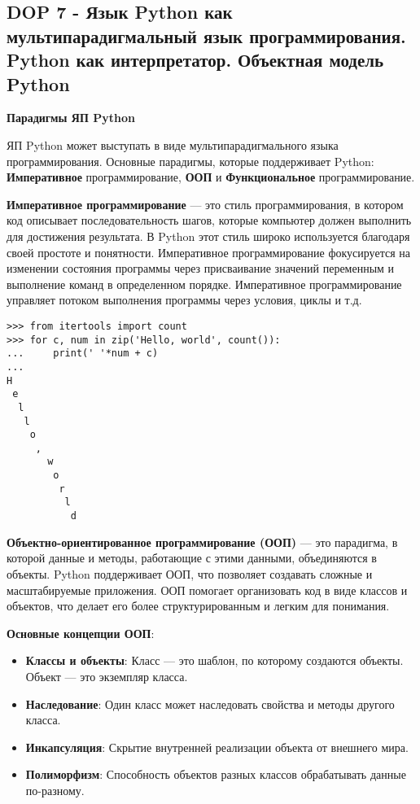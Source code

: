 \subsection*{DOP 7 - Язык Python как мультипарадигмальный язык программирования. Python как интерпретатор. Объектная модель Python}


\textbf{Парадигмы ЯП Python}

ЯП Python может выступать в виде мультипарадигмального языка программирования. Основные парадигмы, которые поддерживает Python: \textbf{Императивное} программирование, \textbf{ООП} и \textbf{Функциональное} программирование.

\textbf{Императивное программирование} — это стиль программирования, в котором код описывает последовательность шагов, которые компьютер должен выполнить для достижения результата. В Python этот стиль широко используется благодаря своей простоте и понятности. Императивное программирование фокусируется на изменении состояния программы через присваивание значений переменным и выполнение команд в определенном порядке. Императивное программирование управляет потоком выполнения программы через условия, циклы и т.д.

\begin{verbatim}
>>> from itertools import count
>>> for c, num in zip('Hello, world', count()):
...     print(' '*num + c)
...
H
 e
  l
   l
    o
     ,
       w
        o
         r
          l
           d
\end{verbatim}

\textbf{Объектно-ориентированное программирование (ООП)} — это парадигма, в которой данные и методы, работающие с этими данными, объединяются в объекты. Python поддерживает ООП, что позволяет создавать сложные и масштабируемые приложения. ООП помогает организовать код в виде классов и объектов, что делает его более структурированным и легким для понимания.

\textbf{Основные концепции ООП}:
\begin{itemize}
    \item \textbf{Классы и объекты}: Класс — это шаблон, по которому создаются объекты. Объект — это экземпляр класса.
    \item \textbf{Наследование}: Один класс может наследовать свойства и методы другого класса.
    \item \textbf{Инкапсуляция}: Скрытие внутренней реализации объекта от внешнего мира.
    \item \textbf{Полиморфизм}: Способность объектов разных классов обрабатывать данные по-разному.
\end{itemize}

